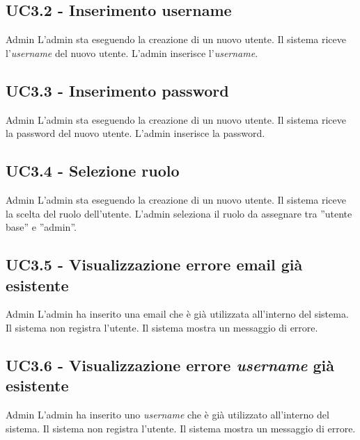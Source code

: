 \subsection{UC3.2 - Inserimento username}
\label{3.2}
\makeUC{}
{Admin}
{L'admin sta eseguendo la creazione di un nuovo utente.}
{Il sistema riceve l'\textit{username} del nuovo utente.}
{L'admin inserisce l'\textit{username}.}{}{}{}{}

\subsection{UC3.3 - Inserimento password}
\label{3.3}
\makeUC{}
{Admin}
{L'admin sta eseguendo la creazione di un nuovo utente.}
{Il sistema riceve la password del nuovo utente.}
{L'admin inserisce la password.}{}{}{}{}

\subsection{UC3.4 - Selezione ruolo}
\label{3.4}
\makeUC{}
{Admin}
{L'admin sta eseguendo la creazione di un nuovo utente.}
{Il sistema riceve la scelta del ruolo dell'utente.}
{L'admin seleziona il ruolo da assegnare tra ''utente base'' e ''admin''.}{}{}{}{}

\subsection{UC3.5 - Visualizzazione errore email già esistente}
\label{3.5}
\makeUC{}
{Admin}
{L'admin ha inserito una email che è già utilizzata all'interno del sistema.}
{Il sistema non registra l'utente.}
{Il sistema mostra un messaggio di errore.}{}{}{}{}

\subsection{UC3.6 - Visualizzazione errore \textit{username} già esistente}
\label{3.6}
\makeUC{}
{Admin} 
{L'admin ha inserito uno \textit{username} che è già utilizzato all'interno del sistema.}
{Il sistema non registra l'utente.}
{Il sistema mostra un messaggio di errore.}{}{}{}{}

